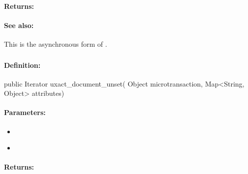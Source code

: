 \paragraph{Returns:}


\paragraph{See also:}  This is the asynchronous form of .

\pagebreak
\subsubsection{}
\label{api:java:uxact_document_unset}


\paragraph{Definition:}
\begin{javacode}
public Iterator uxact_document_unset(
        Object microtransaction,
        Map<String, Object> attributes)
\end{javacode}

\paragraph{Parameters:}
\begin{itemize}[noitemsep]
\item {}\\

\item {}\\

\end{itemize}

\paragraph{Returns:}


\pagebreak
\subsubsection{}
\label{api:java:cond_document_unset}


